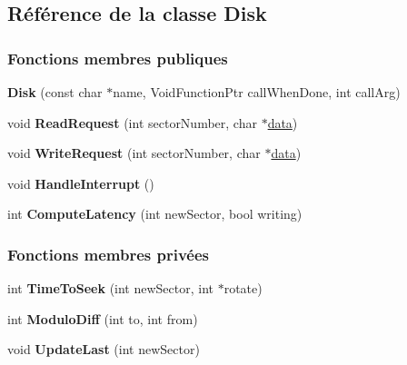 \hypertarget{class_disk}{}\subsection{Référence de la classe Disk}
\label{class_disk}
\subsubsection*{Fonctions membres publiques}
\begin{DoxyCompactItemize}
\item 
\hypertarget{class_disk_a3e2ac7e4ca32bbec9b1acb015a4a71fa}{}\label{class_disk_a3e2ac7e4ca32bbec9b1acb015a4a71fa} 
{\bfseries Disk} (const char $\ast$name, Void\+Function\+Ptr call\+When\+Done, int call\+Arg)
\item 
\hypertarget{class_disk_a8b51a82d4f2fd009335d0c591ae11042}{}\label{class_disk_a8b51a82d4f2fd009335d0c591ae11042} 
void {\bfseries Read\+Request} (int sector\+Number, char $\ast$\hyperlink{structdata}{data})
\item 
\hypertarget{class_disk_aec33797c6480a8c919fc7d340c316abe}{}\label{class_disk_aec33797c6480a8c919fc7d340c316abe} 
void {\bfseries Write\+Request} (int sector\+Number, char $\ast$\hyperlink{structdata}{data})
\item 
\hypertarget{class_disk_a32d4a38e61501c221163ef845b9d6969}{}\label{class_disk_a32d4a38e61501c221163ef845b9d6969} 
void {\bfseries Handle\+Interrupt} ()
\item 
\hypertarget{class_disk_a2337b1c68eb5f6a15502d8327d15248b}{}\label{class_disk_a2337b1c68eb5f6a15502d8327d15248b} 
int {\bfseries Compute\+Latency} (int new\+Sector, bool writing)
\end{DoxyCompactItemize}
\subsubsection*{Fonctions membres privées}
\begin{DoxyCompactItemize}
\item 
\hypertarget{class_disk_abecdf19e160925b1bc9b4542c90de2ac}{}\label{class_disk_abecdf19e160925b1bc9b4542c90de2ac} 
int {\bfseries Time\+To\+Seek} (int new\+Sector, int $\ast$rotate)
\item 
\hypertarget{class_disk_a2b4e12aa9e93939c3e03985c16bed453}{}\label{class_disk_a2b4e12aa9e93939c3e03985c16bed453} 
int {\bfseries Modulo\+Diff} (int to, int from)
\item 
\hypertarget{class_disk_aa87426eeedc8cf390fa4b293ecd34b42}{}\label{class_disk_aa87426eeedc8cf390fa4b293ecd34b42} 
void {\bfseries Update\+Last} (int new\+Sector)
\end{DoxyCompactItemize}
